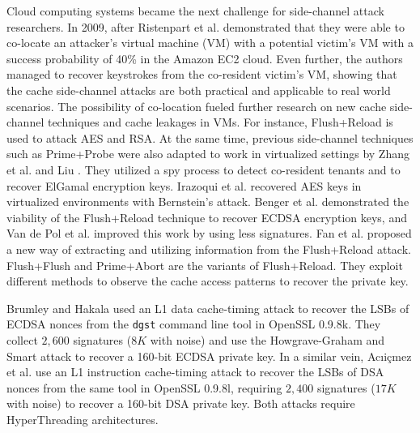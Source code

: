 Cloud computing systems became the next challenge for side-channel attack researchers.
In 2009, after Ristenpart et al. \cite{get-off-my-cloud} demonstrated that they were able to co-locate an attacker’s virtual machine (VM) with a potential victim’s VM with a success probability of 40\% in the Amazon EC2 cloud.
 Even further, the authors managed to recover keystrokes from the co-resident victim’s VM, showing that the cache side-channel attacks are both practical and applicable to real world scenarios.
The possibility of co-location fueled further research on new cache side-channel techniques and cache leakages in VMs.
For instance, Flush+Reload is used to attack AES \cite{Irazoqui2014} and RSA\cite{flushreload}.
At the same time, previous side-channel techniques such as Prime+Probe were also
adapted to work in virtualized settings by Zhang et al. \cite{YinqianZhang2012-cross-vm} and Liu \cite{liu2015last}.
They utilized a spy process to detect co-resident tenants and to recover ElGamal encryption keys.
Irazoqui et al. \cite{fine2014} recovered AES keys in virtualized environments with Bernstein’s attack.
Benger et al. \cite{Benger2014} demonstrated the viability of the Flush+Reload technique to recover ECDSA encryption keys,
and Van de Pol et al. \cite{Van2015} improved this work by using less signatures.
Fan et al. \cite{Fan2016} proposed a new way of extracting and utilizing information from the Flush+Reload attack.
Flush+Flush \cite{gruss2016flush} and Prime+Abort \cite{disselkoen2017prime+abort} are the variants of Flush+Reload.
They exploit different methods to observe the cache access patterns to recover the private key.


Brumley and Hakala \cite{Brumley2009} used an L1 data cache-timing attack to recover the LSBs of ECDSA nonces from the \verb+dgst+ command line tool in OpenSSL 0.9.8k.
 They collect $2,600$ signatures ($8K$ with noise) and use the Howgrave-Graham and Smart \cite{HG2001} attack to recover a 160-bit ECDSA private key.
In a similar vein, Ac{\i}i{\c{c}}mez et al. \cite{Brumley2010} use an L1 instruction cache-timing attack to recover the LSBs of DSA nonces from the same tool in OpenSSL 0.9.8l, requiring $2,400$ signatures ($17K$ with noise) to recover a 160-bit DSA private key.
 Both attacks require HyperThreading architectures.


